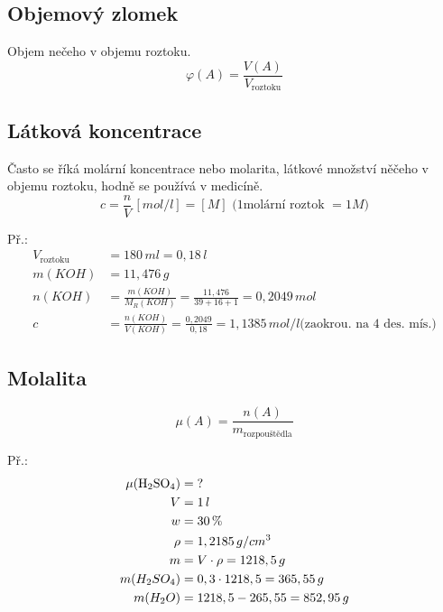 \documentclass{article}
\begin{document}
\subsection{Objemový zlomek}
Objem nečeho v objemu roztoku.
\[
\varphi (A) = \frac{V(A)}{V_\text{roztoku}}
\]

\subsection{Látková koncentrace}
Často se říká molární koncentrace nebo molarita, látkové množství něčeho v objemu roztoku, hodně se používá v medicíně.
\[
c = \frac{n}{V}\, [mol/l]=[M] \text{ (1molární roztok }=1M \text{)}
\]

Př.:
\begin{align*}
V_\text{roztoku} &= 180 \, ml = 0,18 \, l\\
m(KOH) &= 11,476 \,g \\
n(KOH) &= \frac{m(KOH)}{M_R (KOH)} = \frac{11,476}{39+16+1} = 0,2049 \,mol\\
c &= \frac{n(KOH)}{V(KOH)} = \frac{0,2049}{0,18} = 1,1385 \,mol/l \text{(zaokrou. na 4 des. mís.)}
\end{align*}

\subsection{Molalita}
\[
    \mu (A) = \frac{n(A)}{m_{\text{rozpouštědla}}}
\]

Př.:
\begin{align*}
  \mu (\ce{H2SO4}) &= \text{?}\\
  V &= 1 \,l\\
  w &= 30\,\%\\
  \rho &= 1,2185 \,g/cm^3\\
  m &= V \cdot \rho  = 1218,5 \,g\\
  m(H_2SO_4) &= 0,3 \cdot 1218,5 = 365,55 \,g\\
  m(H_2O) &= 1218,5 - 265,55 = 852,95 \,g
\end{align*}
\end{document}

